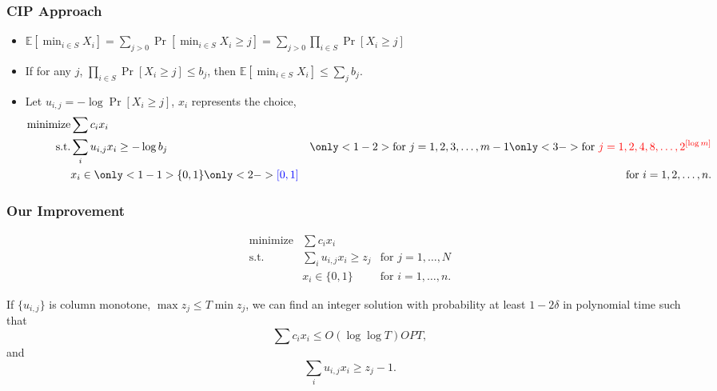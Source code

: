 \documentclass{beamer}
\newcommand{\Exp}{{\mathbb{E}}}
\begin{document}
\begin{frame}
    \frametitle{CIP Approach}
    \begin{itemize}
        \item $\Exp[\min_{i\in S} X_i]
            = \sum_{j > 0} \Pr[\min_{i\in S} X_i \geq j] 
            = \sum_{j > 0} \prod_{i\in S}\Pr[X_i \geq j]$
        \item If for any $j$, $\prod_{i\in S}\Pr[X_i \geq j] \leq b_j$, then $\Exp[\min_{i\in S} X_i] \leq \sum_j b_j$.
        \item Let $u_{i,j} = -\log \Pr[X_i \geq j]$, $x_i$ represents the choice,
            \begin{align*}
                \text{minimize} & \sum c_i x_i & \\
                \text{s.t.}
                & \sum_i u_{i,j} x_i \geq -\log b_j
                & \only<1-2>{ \text{for } j = 1, 2, 3, \ldots, m - 1} 
                \only<3->{\text{for } {\color{red} j = 1, 2, 4, 8, \ldots, 2^{[\log m]}}}\\
            & x_i \in 
                \only<1-1>{\{0, 1\}} 
                \only<2->{{\color{blue} [0,1]}} 
                & \text{for } i = 1, 2, \ldots, n.
            \end{align*}
    \end{itemize}
\end{frame}

\begin{frame}
    \frametitle{Our Improvement}
     \begin{align*}
                \text{minimize} & \sum c_i x_i & \\
                \text{s.t.}
                & \sum_i u_{i,j} x_i \geq z_j
                & \text{for } j = 1, \ldots, N\\
            & x_i \in \{0, 1\}
                & \text{for } i = 1, \ldots, n.
            \end{align*}

        \begin{theorem}
            If $\{u_{i,j}\}$ is column monotone, $\max z_j \leq T\min z_j$, we can find an integer solution with probability at least $1-2\delta$ in polynomial time such that
            $$\sum c_ix_i \leq O(\log\log T)OPT,$$
            and
            $$\sum_i u_{i,j} x_i \geq z_j - 1.$$
        \end{theorem}
\end{frame}
\end{document}

